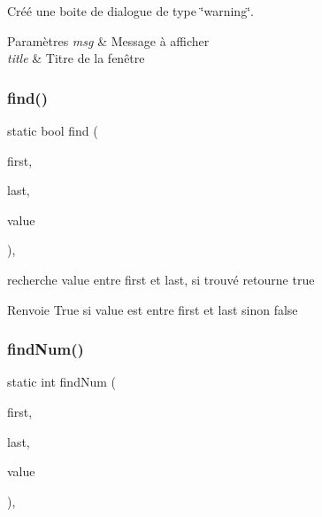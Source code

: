 Créé une boite de dialogue de type \char`\"{}warning\char`\"{}. 


\begin{DoxyParams}{Paramètres}
{\em msg} & Message à afficher \\
\hline
{\em title} & Titre de la fenêtre \\
\hline
\end{DoxyParams}
\mbox{\label{classutils_a9b2123e5c94d7736f5f32ab222d194df}} 
\subsubsection{\texorpdfstring{find()}{find()}}
{\footnotesize\ttfamily static bool find (\begin{DoxyParamCaption}\item[{Input\+It}]{first,  }\item[{Input\+It}]{last,  }\item[{const T \&}]{value }\end{DoxyParamCaption})\hspace{0.3cm}{\ttfamily [inline]}, {\ttfamily [static]}}



recherche value entre first et last, si trouvé retourne true 

\begin{DoxyReturn}{Renvoie}
True si value est entre first et last sinon false 
\end{DoxyReturn}
\mbox{\label{classutils_a8eff63d3e19d4e7c3f4a862aa639621e}} 
\subsubsection{\texorpdfstring{find\+Num()}{findNum()}}
{\footnotesize\ttfamily static int find\+Num (\begin{DoxyParamCaption}\item[{Input\+It}]{first,  }\item[{Input\+It}]{last,  }\item[{const T \&}]{value }\end{DoxyParamCaption})\hspace{0.3cm}{\ttfamily [inline]}, {\ttfamily [static]}}



